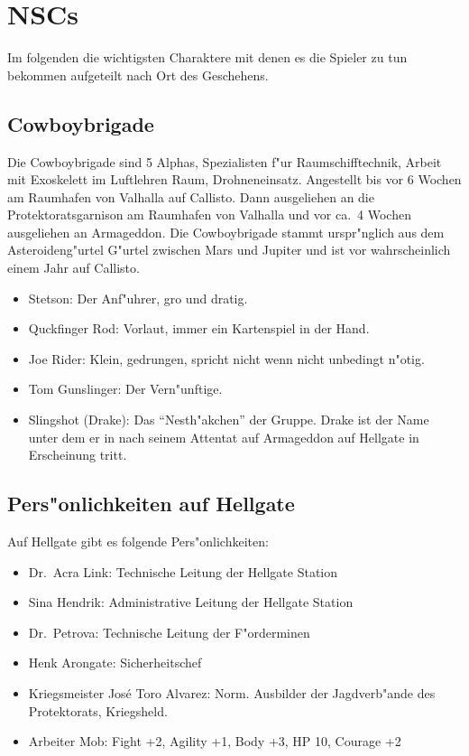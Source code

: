 \section{NSCs}

Im folgenden die wichtigsten Charaktere mit denen es die Spieler zu tun bekommen aufgeteilt nach Ort des Geschehens.

\subsection{Cowboybrigade}

Die Cowboybrigade sind 5 Alphas, Spezialisten f"ur Raumschifftechnik, Arbeit mit Exoskelett im Luftlehren Raum, Drohneneinsatz.
Angestellt bis vor 6 Wochen am Raumhafen von Valhalla auf Callisto. Dann ausgeliehen an die Protektoratsgarnison am Raumhafen von Valhalla und vor ca.~4 Wochen ausgeliehen an Armageddon. Die Cowboybrigade stammt urspr"nglich aus dem Asteroideng"urtel G"urtel zwischen Mars und Jupiter und ist vor wahrscheinlich einem Jahr auf Callisto.

\begin{itemize}
    \item Stetson: Der Anf"uhrer, gro\3 und dratig.
    \item Quckfinger Rod: Vorlaut, immer ein Kartenspiel in der Hand.
    \item Joe Rider: Klein, gedrungen, spricht nicht wenn nicht unbedingt n"otig.
    \item Tom Gunslinger: Der Vern"unftige.
    \item Slingshot (Drake): Das "`Nesth"akchen"' der Gruppe. Drake ist der Name unter dem er in nach seinem Attentat 
    auf Armageddon auf Hellgate in Erscheinung tritt.
\end{itemize}

\newpage

\subsection{Pers"onlichkeiten auf Hellgate}

Auf Hellgate gibt es folgende Pers"onlichkeiten: 

\begin{itemize}
    \item Dr.~Acra Link: Technische Leitung der Hellgate Station
    \item Sina Hendrik: Administrative Leitung der Hellgate Station
    \item Dr.~Petrova: Technische Leitung der F"orderminen
    \item Henk Arongate: Sicherheitschef    
    \item Kriegsmeister Jos\'{e} \frqq{}Toro\flqq{} Alvarez: Norm. Ausbilder der Jagdverb"ande des Protektorats, Kriegsheld.
    \item Arbeiter Mob: Fight +2, Agility +1, Body +3, HP 10, Courage +2
\end{itemize}

